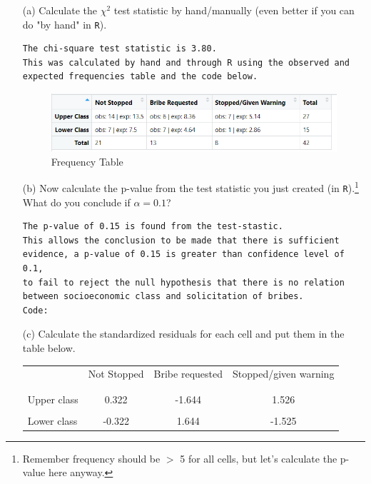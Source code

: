 \documentclass[12pt,letterpaper]{article}
\begin{document}
\begin{enumerate}
	\item [(a)]
	Calculate the $\chi^2$ test statistic by hand/manually (even better if you can do "by hand" in \texttt{R}).
\begin{Verbatim}
The chi-square test statistic is 3.80. 
This was calculated by hand and through R using the observed and 
expected frequencies table and the code below.
\end{Verbatim}
\begin{figure}[h!]\centering
	\caption{\footnotesize Frequency Table}
	\label{fig:Table 1}
	\includegraphics[width=.85\textwidth]{frequencies.png}
\end{figure}
  
	
	\item [(b)]
	Now calculate the p-value from the test statistic you just created (in \texttt{R}).\footnote{Remember frequency should be $>$ 5 for all cells, but let's calculate the p-value here anyway.}  What do you conclude if $\alpha = 0.1$?\\
\begin{Verbatim}
The p-value of 0.15 is found from the test-stastic. 
This allows the conclusion to be made that there is sufficient 
evidence, a p-value of 0.15 is greater than confidence level of 0.1, 
to fail to reject the null hypothesis that there is no relation 
between socioeconomic class and solicitation of bribes. 
Code:
\end{Verbatim}
  
	\item [(c)] Calculate the standardized residuals for each cell and put them in the table below.
	\vspace{1cm}
	
	\begin{table}[h]
		\centering
		\begin{tabular}{l | c c c }
			& Not Stopped & Bribe requested & Stopped/given warning \\
			\\[-1.8ex] 
			\hline \\[-1.8ex]
			Upper class  & 0.322 & -1.644  & 1.526  \\
			\\
			Lower class & -0.322 & 1.644  & -1.525  \\
		\end{tabular}
	\end{table}
  


\end{enumerate}
\end{document}
